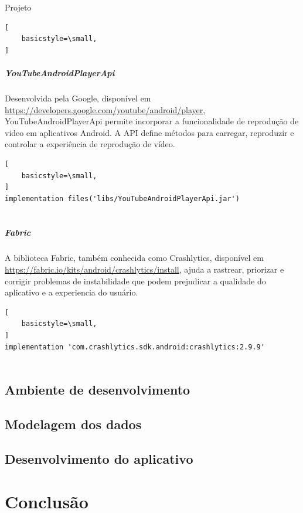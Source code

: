 \documentclass[
	12pt,				%
	openright,			%
	twoside,			%
	a4paper,			%
	english,			%
	french,				%
	spanish,			%
	brazil				%
	]{abntex2}
\begin{document}
\begin{chapter}{Projeto}
\begin{lstlisting}[
    basicstyle=\small,
]
\end{lstlisting}
   \paragraph{YouTubeAndroidPlayerApi}
   Desenvolvida pela Google, disponível em \url{https://developers.google.com/youtube/android/player}, YouTubeAndroidPlayerApi permite incorporar a funcionalidade de reprodução de video em aplicativos Android. A API  define métodos para carregar, reproduzir 
e controlar a experiência de reprodução de vídeo.
      \begin{lstlisting}[
    basicstyle=\small,
]
implementation files('libs/YouTubeAndroidPlayerApi.jar')
   
\end{lstlisting}
   \paragraph{Fabric}
   A biblioteca Fabric, também conhecida como Crashlytics, disponível em \url{https://fabric.io/kits/android/crashlytics/install}, ajuda a rastrear, priorizar e corrigir problemas de instabilidade que podem prejudicar a qualidade do aplicativo e a experiencia do usuário.
   \begin{lstlisting}[
    basicstyle=\small,
]
implementation 'com.crashlytics.sdk.android:crashlytics:2.9.9'
   
\end{lstlisting}



\newpage

 


\section{Ambiente de desenvolvimento}
\section{Modelagem dos dados}
\section{Desenvolvimento do aplicativo}

\end{chapter}

\chapter{Conclusão}
\end{document}
